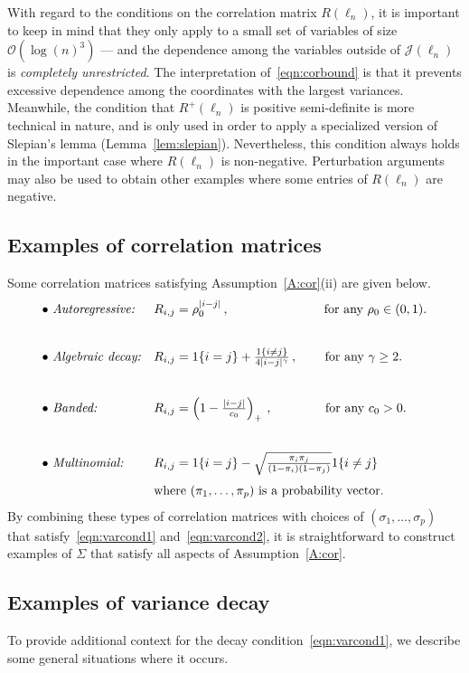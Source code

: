 \documentclass[aos,preprint]{imsart}
\numberwithin{equation}{section}
\theoremstyle{plain}
\newcommand{\J}{\mathcal{J}}
\newcommand{\ts}{\textstyle}
\newcommand{\1}{{\bf{1}}}
\newcommand{\0}{\mathbf{0}}
\begin{document}
With regard to the conditions on the correlation matrix $R(\ell_n)$, it is important to keep in mind that they only apply to a small set of variables of size $\mathcal{O}(\log(n)^3)$ --- and the dependence among the variables outside of $\J(\ell_n)$ is \emph{completely unrestricted}.
%
The interpretation of~\eqref{eqn:corbound} is that it prevents excessive dependence among the coordinates with the largest variances. Meanwhile, the condition that $R^+(\ell_n)$ is positive semi-definite is more technical in nature, and is only used in order to apply a specialized version of Slepian's lemma (Lemma~\ref{lem:slepian}). Nevertheless, this condition always holds in the important case where $R(\ell_n)$ is non-negative. Perturbation arguments may also be used to obtain other examples where some entries of $R(\ell_n)$ are negative.


\subsection{Examples of correlation matrices} 
Some correlation matrices satisfying Assumption~\eqref{A:cor}(ii) are given below.
%
\small
\begin{align*}
\ \ \ \ \ \ & \text{$\bullet$ \emph{Autoregressive:}} && R_{i,j}=\rho_{0}^{|i-j|} \, , \quad\quad\quad\quad\quad\quad\quad \, \ \text{for any } \rho_0\in(0,1). &&& \\[0.7cm]
%
\ \ \ \ \ \ &\text{$\bullet$ \emph{Algebraic decay:}} &&  R_{i,j}=1\{i=j\}+\ts\frac{1\{i\neq j\}}{4|i-j|^{\gamma}} \, , \, \ \, \, \ \ \ \text{ for any} \ \gamma \geq 2.  &&&  \\[0.7cm]
%
%
\ \ \ \ \ \ &\text{$\bullet$ \emph{Banded:}} && R_{i,j}=\Big(1-\ts\frac{|i-j|}{c_0}\Big)_+ \ ,\quad\quad\quad \,\ \  \text{ for any } c_0>0.\\[0.7cm]
%
\ \ \ \ \ \ &\text{$\bullet$ \emph{Multinomial:}} && R_{i,j}=1\{i=j\}-\sqrt{\ts\frac{\pi_i\pi_j}{(1-\pi_i)(1-\pi_j)}}1\{i\neq j\}\,\\[0.1cm]
%
 & \ && \text{where $(\pi_1,\dots,\pi_p)$ is a probability vector.}
\end{align*}
%
\normalsize
%
By combining these types of correlation matrices with choices of $(\sigma_1,\dots,\sigma_p)$ that satisfy~\eqref{eqn:varcond1} and~\eqref{eqn:varcond2}, it is straightforward to construct examples of $\Sigma$ that satisfy all aspects of  Assumption~\ref{A:cor}.



\subsection{Examples of variance decay}\label{sec:decayexamples}
To provide additional context for the decay condition~\eqref{eqn:varcond1}, we describe some general situations where it occurs.
\end{document}

